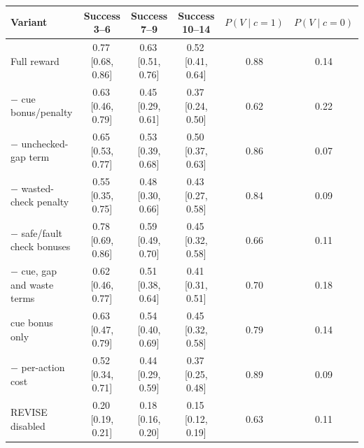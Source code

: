 \begin{tabular}{lccccc}
\toprule
Variant & Success 3--6 & Success 7--9 & Success 10--14 & $P(V\mid c{=}1)$ & $P(V\mid c{=}0)$ \\
\midrule
Full reward & 0.77\,{\scriptsize[0.68, 0.86]} & 0.63\,{\scriptsize[0.51, 0.76]} & 0.52\,{\scriptsize[0.41, 0.64]} & 0.88 & 0.14 \\
$-$ cue bonus/penalty & 0.63\,{\scriptsize[0.46, 0.79]} & 0.45\,{\scriptsize[0.29, 0.61]} & 0.37\,{\scriptsize[0.24, 0.50]} & 0.62 & 0.22 \\
$-$ unchecked-gap term & 0.65\,{\scriptsize[0.53, 0.77]} & 0.53\,{\scriptsize[0.39, 0.68]} & 0.50\,{\scriptsize[0.37, 0.63]} & 0.86 & 0.07 \\
$-$ wasted-check penalty & 0.55\,{\scriptsize[0.35, 0.75]} & 0.48\,{\scriptsize[0.30, 0.66]} & 0.43\,{\scriptsize[0.27, 0.58]} & 0.84 & 0.09 \\
$-$ safe/fault check bonuses & 0.78\,{\scriptsize[0.69, 0.86]} & 0.59\,{\scriptsize[0.49, 0.70]} & 0.45\,{\scriptsize[0.32, 0.58]} & 0.66 & 0.11 \\
$-$ cue, gap and waste terms & 0.62\,{\scriptsize[0.46, 0.77]} & 0.51\,{\scriptsize[0.38, 0.64]} & 0.41\,{\scriptsize[0.31, 0.51]} & 0.70 & 0.18 \\
cue bonus only & 0.63\,{\scriptsize[0.47, 0.79]} & 0.54\,{\scriptsize[0.40, 0.69]} & 0.45\,{\scriptsize[0.32, 0.58]} & 0.79 & 0.14 \\
$-$ per-action cost & 0.52\,{\scriptsize[0.34, 0.71]} & 0.44\,{\scriptsize[0.29, 0.59]} & 0.37\,{\scriptsize[0.25, 0.48]} & 0.89 & 0.09 \\
REVISE disabled & 0.20\,{\scriptsize[0.19, 0.21]} & 0.18\,{\scriptsize[0.16, 0.20]} & 0.15\,{\scriptsize[0.12, 0.19]} & 0.63 & 0.11 \\
\bottomrule
\end{tabular}
